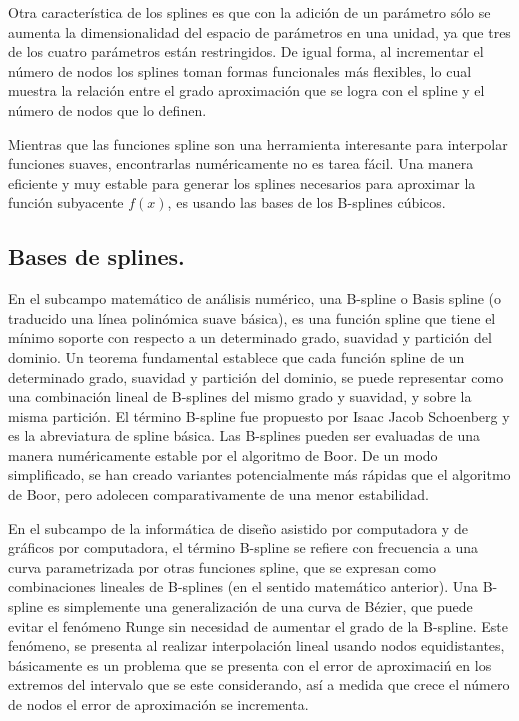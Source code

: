 \hspace{0.4cm} Otra caracter\'istica de los splines es que con la adici\'on de un par\'ametro s\'olo se aumenta la dimensionalidad del espacio de par\'ametros en una unidad, ya que tres de los cuatro par\'ametros est\'an restringidos. De igual forma, al incrementar el n\'umero de nodos los splines toman formas funcionales m\'as flexibles, lo cual muestra la relaci\'on entre el grado aproximaci\'on que se logra con el spline y el n\'umero de nodos que lo definen.


\hspace{0.4cm} Mientras que las funciones spline son una herramienta interesante para interpolar funciones suaves, encontrarlas num\'ericamente no es tarea f\'acil. Una manera eficiente y muy estable para generar los splines necesarios para aproximar la funci\'on subyacente $f(x)$, es usando las bases de los B-splines c\'ubicos.


\subsection{Bases de splines.\\}

\hspace{0.4cm} En el subcampo matem\'atico de an\'alisis num\'erico, una B-spline o Basis spline (o traducido una l\'inea polin\'omica suave b\'asica), es una funci\'on spline que tiene el m\'inimo soporte con respecto a un determinado grado, suavidad y partici\'on del dominio. Un teorema fundamental establece que cada funci\'on spline de un determinado grado, suavidad y partici\'on del dominio, se puede representar como una combinaci\'on lineal de B-splines del mismo grado y suavidad, y sobre la misma partici\'on. El t\'ermino B-spline fue propuesto por Isaac Jacob Schoenberg y es la abreviatura de spline b\'asica. Las B-splines pueden ser evaluadas de una manera num\'ericamente estable por el algoritmo de Boor. De un modo simplificado, se han creado variantes potencialmente m\'as r\'apidas que el algoritmo de Boor, pero adolecen comparativamente de una menor estabilidad.

\hspace{0.4cm} En el subcampo de la inform\'atica de dise\~no asistido por computadora y de gr\'aficos por computadora, el t\'ermino B-spline se refiere con frecuencia a una curva parametrizada por otras funciones spline, que se expresan como combinaciones lineales de B-splines (en el sentido matem\'atico anterior). Una B-spline es simplemente una generalizaci\'on de una curva de B\'ezier, que puede evitar el fen\'omeno Runge sin necesidad de aumentar el grado de la B-spline. Este fen\'omeno, se presenta al realizar interpolaci\'on lineal usando nodos equidistantes, b\'asicamente es un problema que se presenta con el error de aproximaci\'n en los extremos del intervalo que se este considerando, as\'i a medida que crece el n\'umero de nodos el error de aproximaci\'on se incrementa. 


